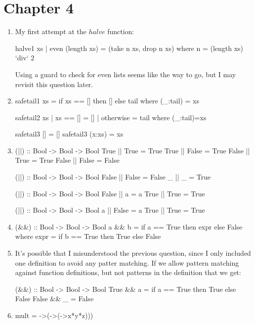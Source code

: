 \documentclass{article}
\begin{document}
\section{Chapter 4}
\begin{enumerate}
\item My first attempt at the $halve$ function:
\begin{code}
halve1 xs | even (length xs) = (take n xs, drop n xs) where n = (length xs) `div` 2
\end{code}
Using a guard to check for even lists seems like the way to go, but I may revisit this question later.

\item 
\begin{code}
safetail1 xs = if xs == [] then [] else tail where (_:tail) = xs

safetail2 xs | xs == []  = []
             | otherwise = tail where (_:tail)=xs
             
safetail3 []     = []
safetail3 (x:xs) = xs
\end{code}

\item
\begin{code}
(||) :: Bool -> Bool -> Bool
True  || True  = True
True  || False = True
False || True  = True
False || False = False

(||) :: Bool -> Bool -> Bool
False || False = False
_     ||    _  = True 

(||) :: Bool -> Bool -> Bool
False || a    = a
True  || True = True

(||) :: Bool -> Bool -> Bool
a    || False = a
True || True  = True
\end{code}

\item 
\begin{code}
(&&) :: Bool -> Bool -> Bool
a && b = if a == True then expr else False
 	 where
            expr = if b == True then True else False
\end{code}

\item It's possible that I misunderstood the previous question, since I only included one definition to avoid any patter matching. If we allow pattern matching against function definitions, but not patterns in the definition that we get:
\begin{code}
(&&) :: Bool -> Bool -> Bool
True && a  = if a == True then True else False
False && _ = False
\end{code}

\item 
\begin{code}
mult = \x->(\y->(\z->x*y*z)))
\end{code}
\end{enumerate}
\end{document}
